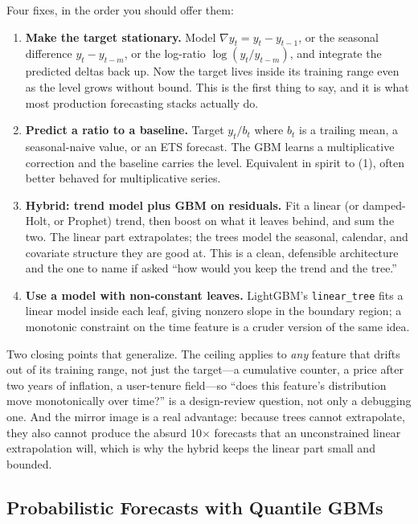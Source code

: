 Four fixes, in the order you should offer them:

\begin{enumerate}
    \item \textbf{Make the target stationary.} Model $\nabla y_t = y_t - y_{t-1}$, or the seasonal difference $y_t - y_{t-m}$, or the log-ratio $\log(y_t / y_{t-m})$, and integrate the predicted deltas back up. Now the target lives inside its training range even as the level grows without bound. This is the first thing to say, and it is what most production forecasting stacks actually do.
    \item \textbf{Predict a ratio to a baseline.} Target $y_t / b_t$ where $b_t$ is a trailing mean, a seasonal-naive value, or an ETS forecast. The GBM learns a multiplicative correction and the baseline carries the level. Equivalent in spirit to (1), often better behaved for multiplicative series.
    \item \textbf{Hybrid: trend model plus GBM on residuals.} Fit a linear (or damped-Holt, or Prophet) trend, then boost on what it leaves behind, and sum the two. The linear part extrapolates; the trees model the seasonal, calendar, and covariate structure they are good at. This is a clean, defensible architecture and the one to name if asked ``how would you keep the trend and the tree.''
    \item \textbf{Use a model with non-constant leaves.} LightGBM's \texttt{linear\_tree} fits a linear model inside each leaf, giving nonzero slope in the boundary region; a monotonic constraint on the time feature is a cruder version of the same idea.
\end{enumerate}

Two closing points that generalize. The ceiling applies to \emph{any} feature that drifts out of its training range, not just the target---a cumulative counter, a price after two years of inflation, a user-tenure field---so ``does this feature's distribution move monotonically over time?'' is a design-review question, not only a debugging one. And the mirror image is a real advantage: because trees cannot extrapolate, they also cannot produce the absurd 10$\times$ forecasts that an unconstrained linear extrapolation will, which is why the hybrid keeps the linear part small and bounded.

\subsection{Probabilistic Forecasts with Quantile GBMs}

